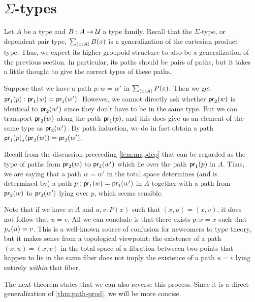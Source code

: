 %

\section{\texorpdfstring{$\Sigma$}{Σ}-types}
\label{sec:compute-sigma}

%
Let $A$ be a type and $B:A\to\mathcal{U}$ a type family.
Recall that the $\Sigma$-type, or dependent pair type, $\sm{x:A} B(x)$ is a generalization of the cartesian product type.
Thus, we expect its higher groupoid structure to also be a generalization of the previous section.
In particular, its paths should be pairs of paths, but it takes a little thought to give the correct types of these paths.

Suppose that we have a path $p:w=w'$ in $\sm{x:A}P(x)$.
Then we get ${\mathsf{pr}_{1}}\mathopen{}\left({p}\right)\mathclose{}:\mathsf{pr}_{1}(w)=\mathsf{pr}_{1}(w')$.
However, we cannot directly ask whether $\mathsf{pr}_{2}(w)$ is identical to $\mathsf{pr}_{2}(w')$ since they don't have to be in the same type.
But we can transport $\mathsf{pr}_{2}(w)$ along the path ${\mathsf{pr}_{1}}\mathopen{}\left({p}\right)\mathclose{}$, and this does give us an element of the same type as $\mathsf{pr}_{2}(w')$.
By path induction, we do in fact obtain a path ${{\mathsf{pr}_{1}}\mathopen{}\left({p}\right)\mathclose{}}_{*}\mathopen{}\left({\mathsf{pr}_{2}(w)}\right)\mathclose{}=\mathsf{pr}_{2}(w')$.

Recall from the discussion preceeding \autoref{lem:mapdep} that
can be regarded as the type of paths from $\mathsf{pr}_{2}(w)$ to $\mathsf{pr}_{2}(w')$ which lie over the path ${\mathsf{pr}_{1}}\mathopen{}\left({p}\right)\mathclose{}$ in $A$.
Thus, we are saying that a path $w=w'$ in the total space determines (and is determined by) a path $p:\mathsf{pr}_{1}(w)=\mathsf{pr}_{1}(w')$ in $A$ together with a path from $\mathsf{pr}_{2}(w)$ to $\mathsf{pr}_{2}(w')$ lying over $p$, which seems sensible.

\begin{rmk}
  Note that if we have $x:A$ and $u,v:P(x)$ such that $(x,u)=(x,v)$, it does not follow that $u=v$.
  All we can conclude is that there exists $p:x=x$ such that ${p}_{*}\mathopen{}\left({u}\right)\mathclose{} = v$.
  This is a well-known source of confusion for newcomers to type theory, but it makes sense from a topological viewpoint: the existence of a path $(x,u)=(x,v)$ in the total space of a fibration betweeen two points that happen to lie in the same fiber does not imply the existence of a path $u=v$ lying entirely \emph{within} that fiber.
\end{rmk}

The next theorem states that we can also reverse this process.
Since it is a direct generalization of \autoref{thm:path-prod}, we will be more concise.

